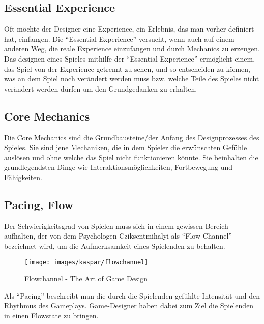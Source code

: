 \subsection{Essential Experience}

Oft möchte der Designer eine Experience, ein Erlebnis, das man vorher definiert hat, einfangen. Die "`Essential Experience"' versucht, wenn auch auf einem anderen Weg, die reale Experience einzufangen und durch Mechanics zu erzeugen. Das designen eines Spieles mithilfe der "`Essential Experience"' ermöglicht einem, das Spiel von der Experience getrennt zu sehen, und so entscheiden zu können, was an dem Spiel noch verändert werden muss bzw. welche Teile des Spieles nicht verändert werden dürfen um den Grundgedanken zu erhalten\cite[S.55]{_art_of_gamedesign}.

\subsection{Core Mechanics}

Die Core Mechanics sind die Grundbausteine/der Anfang des Designprozesses des Spieles. Sie sind jene Mechaniken, die in dem Spieler die erwünschten Gefühle auslösen und ohne welche das Spiel nicht funktionieren könnte. Sie beinhalten die grundlegendsten Dinge wie Interaktionsmöglichkeiten, Fortbewegung und Fähigkeiten\cite[S.330]{_game_design_workshop}.

\subsection{Pacing, Flow\label{_flow}}

Der Schwierigkeitsgrad von Spielen muss sich in einem gewissen Bereich aufhalten, der von dem Psychologen Cziksentmihalyi als "`Flow Channel"' bezeichnet wird, um die Aufmerksamkeit eines Spielenden zu behalten\cite[S.205]{_art_of_gamedesign}.

\begin{figure}[H]
	\centering
	\texttt{[image: images/kaspar/flowchannel]}
	\caption{Flowchannel - The Art of Game Design\cite{_art_of_gamedesign}}
\end{figure}

Als "`Pacing"' beschreibt man die durch die Spielenden gefühlte Intensität und den Rhythmus des Gameplays\cite{_the_level_design_book}. Game-Designer haben dabei zum Ziel die Spielenden in einen Flowstate zu bringen.

